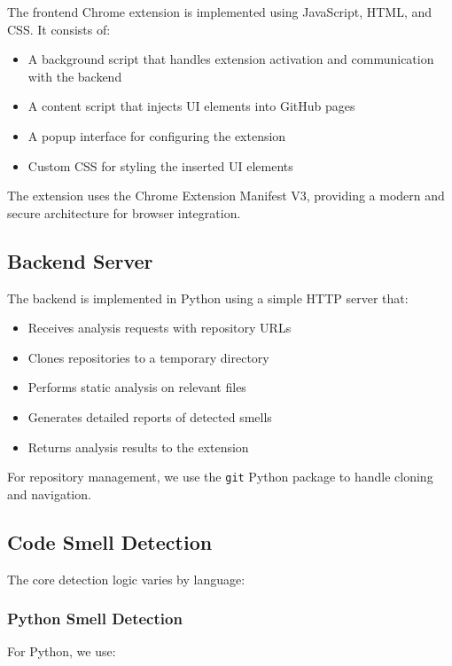 \documentclass[sigconf,screen]{acmart}
\begin{document}
The frontend Chrome extension is implemented using JavaScript, HTML, and CSS. It consists of:

\begin{itemize}
    \item A background script that handles extension activation and communication with the backend
    \item A content script that injects UI elements into GitHub pages
    \item A popup interface for configuring the extension
    \item Custom CSS for styling the inserted UI elements
\end{itemize}

The extension uses the Chrome Extension Manifest V3, providing a modern and secure architecture for browser integration.

\subsection{Backend Server}

The backend is implemented in Python using a simple HTTP server that:

\begin{itemize}
    \item Receives analysis requests with repository URLs
    \item Clones repositories to a temporary directory
    \item Performs static analysis on relevant files
    \item Generates detailed reports of detected smells
    \item Returns analysis results to the extension
\end{itemize}

For repository management, we use the \texttt{git} Python package to handle cloning and navigation.

\subsection{Code Smell Detection}

The core detection logic varies by language:

\subsubsection{Python Smell Detection}

For Python, we use:
\end{document}
